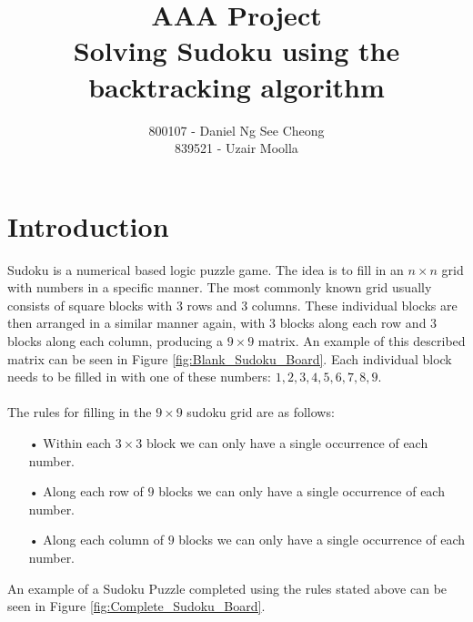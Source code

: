 \documentclass[12pt,a4paper,titlepage]{article}
\author{800107 - Daniel Ng See Cheong\\
		839521 - Uzair Moolla}
\title{
	AAA Project\\
	\large Solving Sudoku using the backtracking algorithm
}
\begin{document}
\maketitle

\section{Introduction}

Sudoku is a numerical based logic puzzle game. The idea is to fill in an $n\times n$ grid with numbers in a specific manner. The most commonly known grid usually consists of square blocks with 3 rows and 3 columns. These individual blocks are then arranged in a similar manner again, with 3 blocks along each row and 3 blocks along each column, producing a $9 \times 9$ matrix. An example of this described matrix can be seen in Figure  \ref{fig:Blank_Sudoku_Board}. Each individual block needs to be filled in  with one of these numbers: ${1,2,3,4,5,6,7,8,9}$.
\\
\\
The rules for filling in the $9 \times 9$ sudoku grid are as follows:
\begin{itemize}
\item[•] Within each $3 \times 3 $ block we can only have a single occurrence of each number.
\item[•] Along each row of $9$ blocks we can only have a single occurrence of each number.
\item[•] Along each column of $9$ blocks we can only have a single occurrence of each number.
\end{itemize}

\noindent
An example of a Sudoku Puzzle completed using the rules stated above can be seen in Figure \ref{fig:Complete_Sudoku_Board}.
\end{document}
